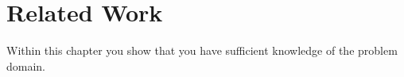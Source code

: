 \chapter{Related Work}\label{relatedwork}
Within this chapter you show that you have sufficient knowledge of the problem domain.

